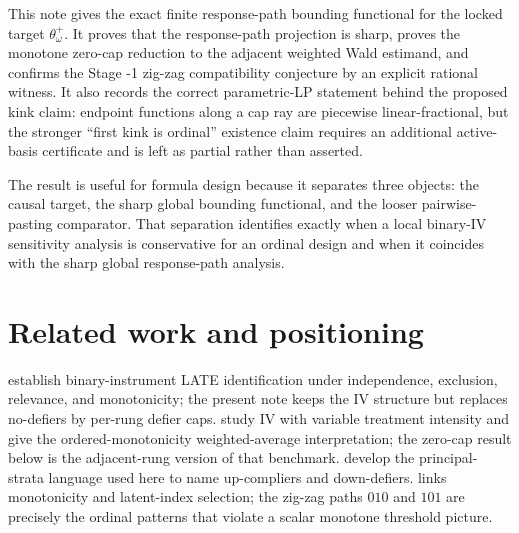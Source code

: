 \documentclass[11pt]{article}
\theoremstyle{definition}
\theoremstyle{plain}
\theoremstyle{remark}
\begin{document}
This note gives the exact finite response-path bounding functional for the
locked target \(\theta^+_\omega\).  It proves that the response-path projection
is sharp, proves the monotone zero-cap reduction to the adjacent weighted Wald
estimand, and confirms the Stage -1 zig-zag compatibility conjecture by an
explicit rational witness.  It also records the correct parametric-LP statement
behind the proposed kink claim: endpoint functions along a cap ray are
piecewise linear-fractional, but the stronger ``first kink is ordinal''
existence claim requires an additional active-basis certificate and is left as
partial rather than asserted.

The result is useful for formula design because it separates three objects:
the causal target, the sharp global bounding functional, and the looser
pairwise-pasting comparator.  That separation identifies exactly when a local
binary-IV sensitivity analysis is conservative for an ordinal design and when
it coincides with the sharp global response-path analysis.

\section{Related work and positioning}
\cite{ImbensAngrist1994} establish binary-instrument LATE identification under
independence, exclusion, relevance, and monotonicity; the present note keeps
the IV structure but replaces no-defiers by per-rung defier caps.
\cite{AngristImbens1995} study IV with variable treatment intensity and give
the ordered-monotonicity weighted-average interpretation; the zero-cap result
below is the adjacent-rung version of that benchmark.  \cite{AngristImbensRubin1996}
develop the principal-strata language used here to name up-compliers and
down-defiers.  \cite{Vytlacil2002} links monotonicity and latent-index
selection; the zig-zag paths \(010\) and \(101\) are precisely the ordinal
patterns that violate a scalar monotone threshold picture.
\end{document}
